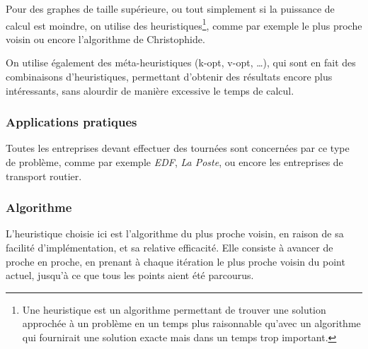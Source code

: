                 Pour des graphes de taille supérieure, ou tout simplement
				si la puissance de calcul est moindre, on utilise des heuristiques\footnote{Une
				heuristique est un algorithme permettant de trouver une solution approchée à un
				problème en un temps plus raisonnable qu'avec un algorithme qui fournirait une
				solution exacte mais dans un temps trop important.},
                comme par exemple le plus proche voisin ou encore l'algorithme de Christophide.

                On utilise également des méta-heuristiques (k-opt, v-opt, \ldots),
                qui sont en fait des combinaisons
                d'heuristiques, permettant d'obtenir des résultats encore plus intéressants,
                sans alourdir de manière excessive le temps de calcul.

        \subsubsection{Applications pratiques}
            Toutes les entreprises devant effectuer des tournées sont concernées
            par ce type de problème, comme par exemple \emph{EDF},
            \emph{La Poste}, ou encore les entreprises de transport routier.
        \subsubsection{Algorithme}
            L'heuristique choisie ici est l'algorithme du plus proche voisin,
            en raison de sa facilité d'implémentation, et sa relative efficacité.
            Elle consiste à avancer de proche en proche, en prenant à chaque itération le plus
            proche voisin du point actuel, jusqu'à ce que tous les points aient
            été parcourus.
